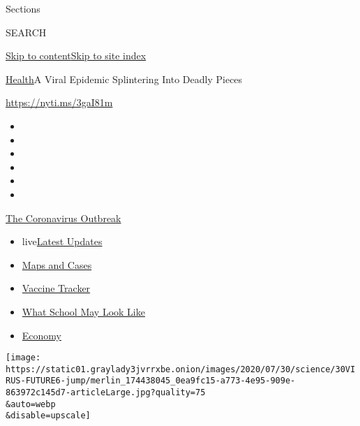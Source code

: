 Sections

SEARCH

\protect\hyperlink{site-content}{Skip to
content}\protect\hyperlink{site-index}{Skip to site index}

\href{/section/health}{Health}\textbar{}A Viral Epidemic Splintering
Into Deadly Pieces

\url{https://nyti.ms/3gaI81m}

\begin{itemize}
\item
\item
\item
\item
\item
\item
\end{itemize}

\href{https://www.nytimes3xbfgragh.onion/news-event/coronavirus?action=click\&pgtype=Article\&state=default\&region=TOP_BANNER\&context=storylines_menu}{The
Coronavirus Outbreak}

\begin{itemize}
\tightlist
\item
  live\href{https://www.nytimes3xbfgragh.onion/2020/08/02/world/coronavirus-updates.html?action=click\&pgtype=Article\&state=default\&region=TOP_BANNER\&context=storylines_menu}{Latest
  Updates}
\item
  \href{https://www.nytimes3xbfgragh.onion/interactive/2020/us/coronavirus-us-cases.html?action=click\&pgtype=Article\&state=default\&region=TOP_BANNER\&context=storylines_menu}{Maps
  and Cases}
\item
  \href{https://www.nytimes3xbfgragh.onion/interactive/2020/science/coronavirus-vaccine-tracker.html?action=click\&pgtype=Article\&state=default\&region=TOP_BANNER\&context=storylines_menu}{Vaccine
  Tracker}
\item
  \href{https://www.nytimes3xbfgragh.onion/interactive/2020/07/29/us/schools-reopening-coronavirus.html?action=click\&pgtype=Article\&state=default\&region=TOP_BANNER\&context=storylines_menu}{What
  School May Look Like}
\item
  \href{https://www.nytimes3xbfgragh.onion/live/2020/07/31/business/stock-market-today-coronavirus?action=click\&pgtype=Article\&state=default\&region=TOP_BANNER\&context=storylines_menu}{Economy}
\end{itemize}

\texttt{[image: https://static01.graylady3jvrrxbe.onion/images/2020/07/30/science/30VIRUS-FUTURE6-jump/merlin\_174438045\_0ea9fc15-a773-4e95-909e-863972c145d7-articleLarge.jpg?quality=75\\\&auto=webp\\\&disable=upscale]}

